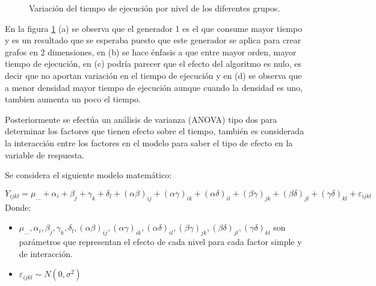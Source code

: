 \documentclass[12pt]{article}
\begin{document}
\begin{figure}[H]
\centering
{}\hspace{5mm} 
\vspace{8mm}
\hspace{5mm}
\caption{Variación del tiempo de ejecución por nivel de los diferentes grupos.} \label{f2}
\end{figure}

En la figura \ref{f2} (a) se observa que el generador 1 es el que consume mayor tiempo y es un resultado que se esperaba puesto que este generador se aplica para crear grafos en 2 dimensiones, en (b) se hace énfasis a que entre mayor orden, mayor tiempo de ejecución, en (c) podría parecer que el efecto del algoritmo es nulo, es decir que no aportan variación en el tiempo de ejecución y en (d) se observa que a menor densidad mayor tiempo de ejecución aunque cuando la densidad es uno, tambien aumenta un poco el tiempo. 

\newpage
Posteriormente se efectúa un análisis de varianza (ANOVA) tipo dos para determinar los factores que tienen efecto sobre el tiempo, también es considerada la interacción entre los factores en el modelo para saber el tipo de efecto en la variable de respuesta.

Se considera el siguiente modelo matemático:

\begin{displaymath} Y_{ijkl} = \mu_{...} + \alpha_i + \beta_j + \gamma_k + \delta_l + (\alpha \beta)_{ij} + (\alpha \gamma)_{ik} + (\alpha \delta)_{il} + (\beta \gamma)_{jk} + (\beta \delta)_{jl} + (\gamma \delta)_{kl} + \varepsilon_{ijkl}
\end{displaymath}
Donde:
\vspace{-.3cm}
\begin{itemize}
\item  $\mu_{...},\alpha_i,\beta_j, \gamma_k, \delta_l,(\alpha \beta)_{ij}, (\alpha \gamma)_{ik}, (\alpha \delta)_{il}, (\beta \gamma)_{jk}, (\beta \delta)_{jl}, (\gamma \delta)_{kl}$  son parámetros que representan el efecto de cada nivel para cada factor simple y de interacción.

\item $\varepsilon_{ijkl} \sim N(0,\sigma^2)$
\end{itemize}
\end{document}
